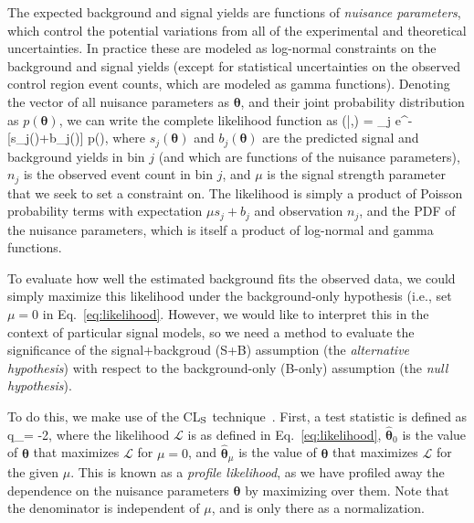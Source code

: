 The expected background and signal yields are functions of \textit{nuisance parameters}, which control
the potential variations from all of the experimental and theoretical uncertainties. In practice these
are modeled as log-normal constraints on the background and signal yields (except for statistical uncertainties
on the observed control region event counts, which are modeled as gamma functions). Denoting the vector
of all nuisance parameters as $\boldsymbol\theta$, and their joint probability distribution as $p(\boldsymbol\theta)$, we can write
the complete likelihood function as
\be\label{eq:likelihood}
(|\mu,\boldsymbol\theta) = \prod_{j\in{}} 
e^{-[\mu s_j(\boldsymbol\theta)+b_j(\boldsymbol\theta)]} p(\boldsymbol\theta),
\ee
where $s_j(\boldsymbol\theta)$ and $b_j(\boldsymbol\theta)$ are the predicted signal and background yields 
in bin $j$ (and which are functions of the nuisance parameters), $n_j$ is the observed event count in bin 
$j$, and $\mu$ is the signal strength parameter that we seek to set a constraint on. The likelihood is 
simply a product of Poisson probability terms with expectation $\mu s_j+b_j$ and observation $n_j$, and the 
PDF of the nuisance parameters, which is itself a product of log-normal and gamma functions.

To evaluate how well the estimated background fits the observed data, we could simply maximize this 
likelihood under the background-only hypothesis (i.e., set $\mu=0$ in Eq.~\ref{eq:likelihood}.
However, we would like to interpret this in the context of particular signal models, so we need a method
to evaluate the significance of the signal+backgroud (S+B) assumption (the \textit{alternative hypothesis})
with respect to the background-only (B-only) assumption (the \textit{null hypothesis}).

To do this, we make use of the CL$_{\mathrm{S}}$ technique~\cite{Read:CLs}.
First, a test statistic is defined as
\be
q_\mu = -2\log{},
\ee
where the likelihood $\mathcal{L}$ is as defined in Eq.~\ref{eq:likelihood}, $\hat{\boldsymbol\theta}_0$
is the value of $\boldsymbol\theta$ that maximizes $\mathcal{L}$ for $\mu=0$, and $\hat{\boldsymbol\theta}_\mu$ is
the value of $\boldsymbol\theta$ that maximizes $\mathcal{L}$ for the given $\mu$. This is known as a
\textit{profile likelihood}, as we have profiled away the dependence on the nuisance parameters $\boldsymbol\theta$
by maximizing over them. Note that the denominator is independent of $\mu$, and is only there as a normalization.

